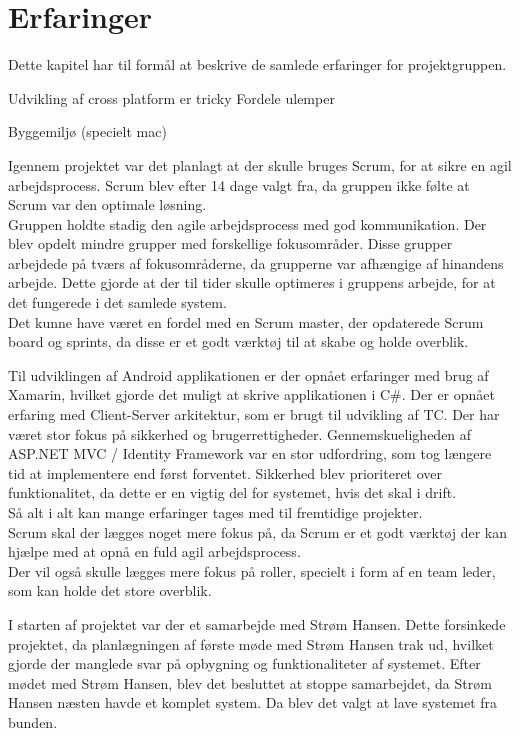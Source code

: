 \chapter{Erfaringer}
Dette kapitel har til formål at beskrive de samlede erfaringer for projektgruppen. 

Udvikling af cross platform er tricky
Fordele ulemper

Byggemiljø (specielt mac)

Igennem projektet var det planlagt at der skulle bruges Scrum, for at sikre en agil arbejdsprocess. Scrum blev efter 14 dage valgt fra, da gruppen ikke følte at Scrum var den optimale løsning.\\
Gruppen holdte stadig den agile arbejdsprocess med god kommunikation. Der blev opdelt mindre grupper med forskellige fokusområder. Disse grupper arbejdede på tværs af fokusområderne, da grupperne var afhængige af hinandens arbejde. Dette gjorde at der til tider skulle optimeres i gruppens arbejde, for at det fungerede i det samlede system.\\

Det kunne have været en fordel med en Scrum master, der opdaterede Scrum board og sprints, da disse er et godt værktøj til at skabe og holde overblik.

Til udviklingen af Android applikationen er der opnået erfaringer med brug af Xamarin, hvilket gjorde det muligt at skrive applikationen i C\#. 
\newline
Der er opnået erfaring med Client-Server arkitektur, som er brugt til udvikling af TC. 
\newline
Der har været stor fokus på sikkerhed og brugerrettigheder. Gennemskueligheden af ASP.NET MVC / Identity Framework var en stor udfordring, som tog længere tid at implementere end først forventet. Sikkerhed blev prioriteret over funktionalitet, da dette er en vigtig del for systemet, hvis det skal i drift.\\

Så alt i alt kan mange erfaringer tages med til fremtidige projekter.\\
Scrum skal der lægges noget mere fokus på, da Scrum er et godt værktøj der kan hjælpe med at opnå en fuld agil arbejdsprocess.\\
Der vil også skulle lægges mere fokus på roller, specielt i form af en team leder, som kan holde det store overblik.

I starten af projektet var der et samarbejde med Strøm Hansen. Dette forsinkede projektet, da planlægningen af første møde med Strøm Hansen trak ud, hvilket gjorde der manglede svar på opbygning og funktionaliteter af systemet. Efter mødet med Strøm Hansen, blev det besluttet at stoppe samarbejdet, da Strøm Hansen næsten havde et komplet system. Da blev det valgt at lave systemet fra bunden. 